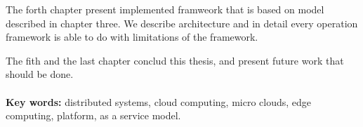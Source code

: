 The forth chapter present implemented framweork that is based on model described in chapter three. We describe architecture and in detail every operation framework is able to do with limitations of the framework.

The fith and the last chapter conclud this thesis, and present future work that should be done.\\\\ 

\noindent
\textbf{Key words:} distributed systems, cloud computing, micro clouds, edge computing, platform, as a service model.